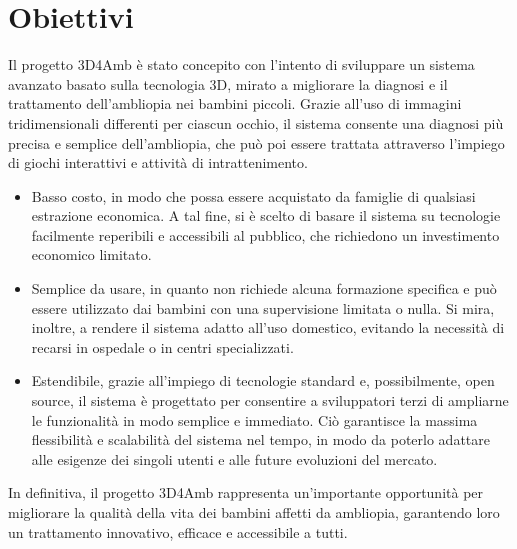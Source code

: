 \documentclass[
a4paper,
cleardoublepage=empty,
headings=twolinechapter,
numbers=autoenddot,
]{scrbook}
\begin{document}
	\section{Obiettivi}
    Il progetto 3D4Amb è stato concepito con l'intento di sviluppare un sistema avanzato basato sulla tecnologia 3D, mirato a migliorare la diagnosi e il trattamento dell'ambliopia nei bambini piccoli. Grazie all'uso di immagini tridimensionali differenti per ciascun occhio, il sistema consente una diagnosi più precisa e semplice dell'ambliopia, che può poi essere trattata attraverso l'impiego di giochi interattivi e attività di intrattenimento.
    \begin{itemize}
    	\item Basso costo, in modo che possa essere acquistato da famiglie di qualsiasi estrazione economica. A tal fine, si è scelto di basare il sistema su tecnologie facilmente reperibili e accessibili al pubblico, che richiedono un investimento economico limitato.
    	\item Semplice da usare, in quanto non richiede alcuna formazione specifica e può essere utilizzato dai bambini con una supervisione limitata o nulla. Si mira, inoltre, a rendere il sistema adatto all'uso domestico, evitando la necessità di recarsi in ospedale o in centri specializzati.
    	\item Estendibile, grazie all'impiego di tecnologie standard e, possibilmente, open source, il sistema è progettato per consentire a sviluppatori terzi di ampliarne le funzionalità in modo semplice e immediato. Ciò garantisce la massima flessibilità e scalabilità del sistema nel tempo, in modo da poterlo adattare alle esigenze dei singoli utenti e alle future evoluzioni del mercato.
    \end{itemize}
    In definitiva, il progetto 3D4Amb rappresenta un'importante opportunità per migliorare la qualità della vita dei bambini affetti da ambliopia, garantendo loro un trattamento innovativo, efficace e accessibile a tutti.
    
\end{document}
